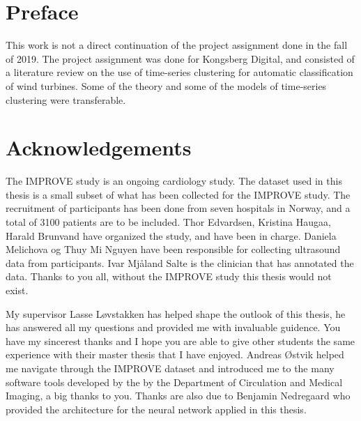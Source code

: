 \section*{Preface}
%

This work is not a direct continuation of the project assignment done in the fall of 2019. The project assignment was done for Kongsberg Digital, and consisted of a literature review on the use of time-series clustering for automatic classification of wind turbines. Some of the theory and some of the models of time-series clustering were transferable.

\section*{Acknowledgements}

The IMPROVE study is an ongoing cardiology study. The dataset used in this thesis is a small subset of what has been collected for the IMPROVE study. The recruitment of participants has been done from seven hospitals in Norway, and a total of 3100 patients are to be included. Thor Edvardsen, Kristina Haugaa, Harald Brunvand have organized the study, and have been in charge. Daniela Melichova og Thuy Mi Nguyen have been responsible for collecting ultrasound data from participants. Ivar Mjåland Salte is the clinician that has annotated the data. Thanks to you all, without the IMPROVE study this thesis would not exist. \bigskip

My supervisor Lasse Løvstakken has helped shape the outlook of this thesis, he has answered all my questions and provided me with invaluable guidence. You have my sincerest thanks and I hope you are able to give other students the same experience with their master thesis that I have enjoyed. Andreas Østvik helped me navigate through the IMPROVE dataset and introduced me to the many software tools developed by the by the Department of Circulation and Medical Imaging, a big thanks to you. Thanks are also due to Benjamin Nedregaard who provided the architecture for the neural network applied in this thesis.

\clearpage
